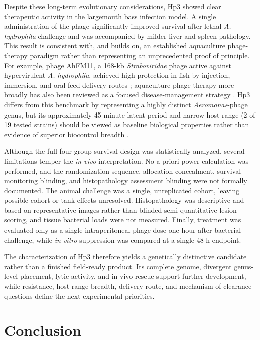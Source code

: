 Despite these long-term evolutionary considerations, Hp3 showed clear
therapeutic activity in the largemouth bass infection model. A single
administration of the phage significantly improved survival after lethal
\emph{A. hydrophila} challenge and was accompanied by milder liver and
spleen pathology. This result is consistent with, and builds on, an
established aquaculture phage-therapy paradigm rather than representing
an unprecedented proof of principle. For example, phage AhFM11, a
168-kb \emph{Straboviridae} phage active against hypervirulent
\emph{A. hydrophila}, achieved high protection in fish by injection,
immersion, and oral-feed delivery routes \citep{2024-Novel_MuliyaSankappa};
aquaculture phage therapy more broadly has also been reviewed as a
focused disease-management strategy \citep{2021-Phage_Ramos-Vivas}.
Hp3 differs from this benchmark by representing a highly distinct
\emph{Aeromonas}-phage genus, but its approximately 45-minute latent
period and narrow host range (2 of 19 tested strains) should be viewed
as baseline biological properties rather than evidence of superior
biocontrol breadth \citep{2022-Characterization_Bujak,
2024-Novel_MuliyaSankappa}.

Although the full four-group survival design was statistically analyzed,
several limitations temper the \emph{in vivo} interpretation. No
a priori power calculation was performed, and the randomization sequence,
allocation concealment, survival-monitoring blinding, and histopathology
assessment blinding were not formally documented. The animal challenge
was a single, unreplicated cohort, leaving possible cohort or tank effects
unresolved. Histopathology was descriptive and based on representative
images rather than blinded semi-quantitative lesion scoring, and tissue
bacterial loads were not measured. Finally, treatment was evaluated only
as a single intraperitoneal phage dose one hour after bacterial challenge,
while \emph{in vitro} suppression was compared at a single 48-h endpoint.

The characterization of Hp3 therefore yields a genetically distinctive
candidate rather than a finished field-ready product. Its complete
genome, divergent genus-level placement, lytic activity, and in vivo
rescue support further development, while resistance, host-range breadth,
delivery route, and mechanism-of-clearance questions define the next
experimental priorities.

\section{Conclusion}\label{conclusion}

